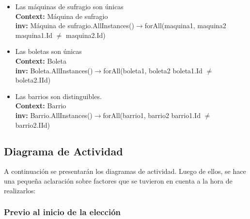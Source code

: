 \documentclass[spanish, 10pt,a4paper]{article}
\numberwithin{equation}{section} %
\begin{document}
\begin{itemize}
	\item Las máquinas de sufragio son únicas
\\	\textbf{Context: }  Máquina de sufragio
\\	\textbf{inv: } Máquina de sufragio.AllInstances()$\rightarrow$forAll(maquina1, maquina2 \textbar maquina1.Id $\neq$ maquina2.Id)

	\item Las boletas son únicas
\\	\textbf{Context: }  Boleta
\\	\textbf{inv: } Boleta.AllInstances()$\rightarrow$forAll(boleta1, boleta2 \textbar boleta1.Id $\neq$ boleta2.IId)

	\item Las barrios son distinguibles.
\\	\textbf{Context: }  Barrio
\\	\textbf{inv: } Barrio.AllInstances()$\rightarrow$forAll(barrio1, barrio2 \textbar barrio1.Id $\neq$ barrio2.IId)
\end{itemize}

\subsection{Diagrama de Actividad}
A continuación se presentarán los diagramas de actividad. Luego de ellos, se hace una pequeña aclaración sobre factores que se tuvieron en cuenta a la hora de realizarlos:

\subsubsection{Previo al inicio de la elección}
\end{document}
